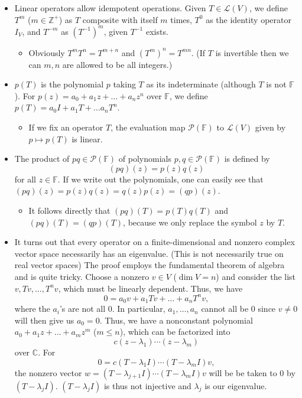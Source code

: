 \documentclass{article}
\newcommand{\C}{\mathbb{C}}
\newcommand{\Z}{\mathbb{Z}}
\newcommand{\F}{\mathbb{F}}
\renewcommand{\d}{\dim}
\newcommand{\LV}{\mathcal{L}(V)}
\newcommand{\PF}{\mathcal{P}(\F)}
\begin{document}
\begin{itemize}
    \item Linear operators allow idempotent operations. Given $T \in \LV$, we define $T^m$ ($m \in \Z^+$) as $T$ composite with itself $m$ times, $T^0$ as the identity operator $I_V$, and $T^{-m}$ as $(T^{-1})^m$, given $T^{-1}$ exists.
    \begin{itemize}
        \item Obviously $T^mT^n = T^{m+n}$ and $(T^m)^n = T^{mn}$. (If $T$ is invertible then we can $m,n$ are allowed to be all integers.)
    \end{itemize}
    \item $p(T)$ is the polynomial $p$ taking $T$ as its indeterminate (although $T$ is not $\F$). For $p(z) = a_0 + a_1 z + \dots + a_n z^n$ over $\F$, we define $p(T) = a_0 I + a_1 T + \dots a_n T^n$.
    \begin{itemize}
        \item If we fix an operator $T$, the evaluation map $\PF$ to $\LV$ given by $p \mapsto p(T)$ is linear.
    \end{itemize}
    \item The product of $pq \in \PF$ of polynomials $p,q \in \PF$ is defined by $$(pq)(z) = p(z)q(z)$$ for all $z \in \F$. If we write out the polynomials, one can easily see that $(pq)(z) = p(z)q(z) = q(z)p(z) = (qp)(z)$. 
    \begin{itemize}
        \item It follows directly that $(pq)(T) = p(T)q(T)$ and $(pq)(T) = (qp)(T)$, because we only replace the symbol $z$ by $T$.
    \end{itemize}
    \item It turns out that every operator on a finite-dimensional and nonzero complex vector space necessarily has an eigenvalue. (This is not necessarily true on real vector spaces) The proof employs the fundamental theorem of algebra and is quite tricky. Choose a nonzero $v \in V$ ($\d V=n$) and consider the list $v, Tv, \dots, T^n v$, which must be linearly dependent. Thus, we have $$0 = a_0 v + a_1 Tv + \dots + a_n T^n v,$$ where the $a_i$'s are not all $0$. In particular, $a_1, \dots, a_n$ cannot all be 0 since $v \not= 0$ will then give us $a_0 = 0$. Thus, we have a nonconstant polynomial $a_0+a_1 z+\dots+a_m z^m$ ($m \leq n$), which can be factorized into $$c(z - \lambda_1)\cdots(z - \lambda_m)$$ over $\C$. For $$0=c(T - \lambda_1 I)\cdots(T - \lambda_m I)v,$$ the nonzero vector $w = (T - \lambda_{j+1} I) \cdots (T - \lambda_m I)v$ will be be taken to 0 by $(T - \lambda_j I)$. $(T - \lambda_j I)$ is thus not injective and $\lambda_j$ is our eigenvalue.
    

\end{itemize}
\end{document}
